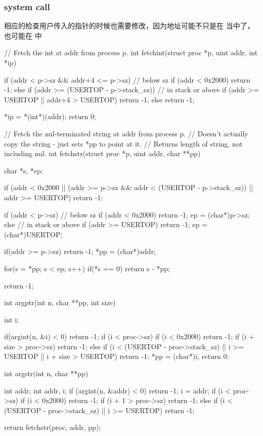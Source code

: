 \subsubsection{system call}

相应的检查用户传入的指针的时候也需要修改，因为地址可能不只是在 \cw{[0, sz)} 当中了，也可能在 \cw{[USERTOP-stack_sz, USERTOP)} 中

\begin{ccode}
    // Fetch the int at addr from process p.
    int
    fetchint(struct proc *p, uint addr, int *ip)
    {
        if (addr < p->sz && addr+4 <= p->sz) { // below sz
            if (addr < 0x2000) return -1;
        } else if (addr >= (USERTOP - p->stack_sz)) { // in stack or above
            if (addr >= USERTOP || addr+4 > USERTOP) return -1;
        } else return -1;

        *ip = *(int*)(addr);
        return 0;
    }

    // Fetch the nul-terminated string at addr from process p.
    // Doesn't actually copy the string - just sets *pp to point at it.
    // Returns length of string, not including nul.
    int
    fetchstr(struct proc *p, uint addr, char **pp)
    {
        char *s, *ep;

        if (addr < 0x2000 || (addr >= p->sz && addr <  
         (USERTOP - p->stack_sz)) || addr >= USERTOP)
            return -1;

        if (addr < p->sz) { // below sz
            if (addr < 0x2000) return -1;
            ep = (char*)p->sz;
        } else { // in stack or above
            if (addr >= USERTOP) return -1;
            ep = (char*)USERTOP;
        }

        if(addr >= p->sz)
            return -1;
        *pp = (char*)addr;
        
        for(s = *pp; s < ep; s++)
            if(*s == 0)
                return s - *pp;
        
        return -1;
    }
    int
    argptr(int n, char **pp, int size)
    {
        int i;
        
        if(argint(n, &i) < 0)
            return -1;
        if (i < proc->sz) {
            if (i < 0x2000) return -1;
            if (i + size > proc->sz) return -1;
        } else {
            if (i < (USERTOP - proc->stack_sz) || i >= USERTOP 
            || i + size > USERTOP) {
                return -1;
            }
        }
        *pp = (char*)i;
        return 0;
    }
    int argstr(int n, char **pp)
    {
        int addr;
        int addr, i;
        if (argint(n, &addr) < 0)
            return -1;
        i = addr;
        if (i < proc->sz)
        {
            if (i < 0x2000)
            return -1;
            if (i + 1 > proc->sz)
            return -1;
        }
        else
        {
            if (i < (USERTOP - proc->stack_sz) || i >= USERTOP) {
            return -1;
            }
        }

        return fetchstr(proc, addr, pp);
    }
\end{ccode}

